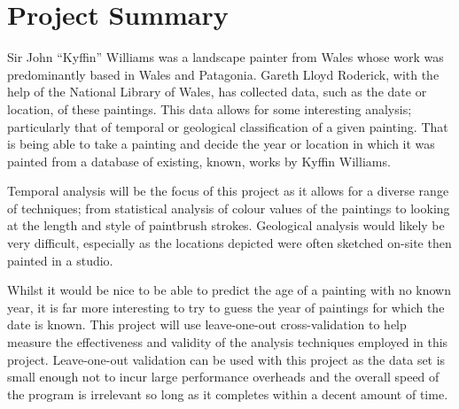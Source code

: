 \documentclass[11pt,fleqn,twoside]{article}
\begin{document}

\mmp

\setcounter{tocdepth}{3} %
\tableofcontents
\listoffigures
\listoftables

\newpage

\section{Project Summary}
Sir John ``Kyffin'' Williams was a landscape painter from Wales whose work was predominantly based 
in Wales and Patagonia. Gareth Lloyd Roderick, with the help of the National Library of Wales, has
collected data, such as the date or location, of these paintings. This data allows for some 
interesting analysis; particularly that of temporal or geological classification of a given 
painting. That is being able to take a painting and decide the year or location in which it was
painted from a database of existing, known, works by Kyffin Williams.

Temporal analysis will be the focus of this project as it allows for a diverse range of techniques;
from statistical analysis of colour values of the paintings to looking at the length and style of 
paintbrush strokes. Geological analysis would likely be very difficult, especially as the locations
depicted were often sketched on-site then painted in a studio.

Whilst it would be nice to be able to predict the age of a painting with no known year, it is far
more interesting to try to guess the year of paintings for which the date is known. This project 
will use leave-one-out cross-validation to help measure the effectiveness and validity of the 
analysis techniques employed in this project. Leave-one-out validation can be used with this 
project as the data set is small enough not to incur large performance overheads and the overall
speed of the program is irrelevant so long as it completes within a decent amount of time.
\end{document}
